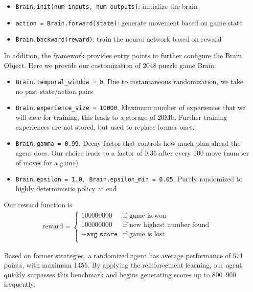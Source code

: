 \documentclass[9pt,twocolumn]{article}
\begin{document}
\begin{itemize}

\item \texttt{Brain.init(num\_inputs, num\_outputs)}: initialize the brain

\item \texttt{action = Brain.forward(state)}: generate movement based on game state

\item \texttt{Brain.backward(reward)}: train the neural network based on reward

\end{itemize}

In addition, the framework provides entry points to further configure the Brain Object. Here we provide our customization of 2048 puzzle game Brain:

\begin{itemize}

\item \texttt{Brain.temporal\_window = 0}. Due to instantaneous randomization, we take no past state/action pairs
\item \texttt{Brain.experience\_size = 10000}. Maximum number of experiences that we will save for training, this leads to a storage of 20Mb. Further training experiences are not stored, but used to replace former ones.
\item \texttt{Brain.gamma = 0.99}. Decay factor that controls how much plan-ahead the agent does. Our choice leads to a factor of 0.36 after every 100 move (number of moves for a game)
\item \texttt{Brain.epsilon = 1.0, Brain.epsilon\_min = 0.05}. Purely randomized to highly deterministic policy at end

\end{itemize}

Our reward function is \begin{align*}
\text{reward} = 
\begin{cases} 
100000000 & \text{if game is won} \\
100000000 & \text{if new highest number found} \\
-\texttt{avg\_score} & \text{if game is lost} \\
\end{cases}
\end{align*}

Based on former strategies, a randomized agent has average performance of 571 points, with maximum 1456. By applying the reinforcement learning, our agent quickly surpasses this benchmark and begins generating scores up to 800~900 frequently. 
\end{document}
